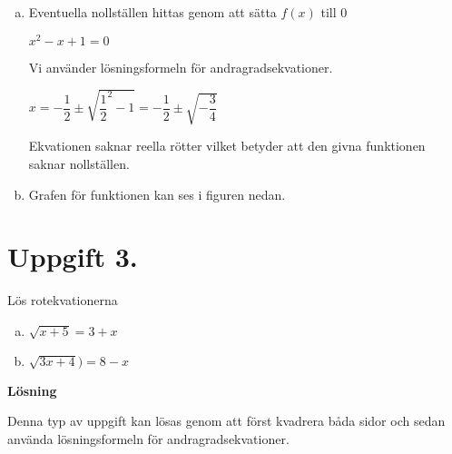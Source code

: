 \documentclass{article}
\begin{document}
\begin{enumerate}[(a)]
\item 
Eventuella nollställen hittas genom att sätta $f(x)$ till $0$

$x^2-x+1=0$

Vi använder lösningsformeln för andragradsekvationer.

$x=-\dfrac{1}{2}\pm\sqrt{\dfrac{1}{2}^2-1}=-\dfrac{1}{2}\pm\sqrt{-\dfrac{3}{4}}$

Ekvationen saknar reella rötter vilket betyder att den givna funktionen saknar nollställen.

\item Grafen för funktionen kan ses i figuren nedan.


\end{enumerate}

\section*{Uppgift 3.}
Lös rotekvationerna
\begin{enumerate}[(a)]
\item $\sqrt{x+5}=3+x$
\item $\sqrt{3x+4})=8-x$
\end{enumerate}

\textbf{Lösning}

Denna typ av uppgift kan lösas genom att först kvadrera båda sidor och sedan använda lösningsformeln för andragradsekvationer.
\end{document}
